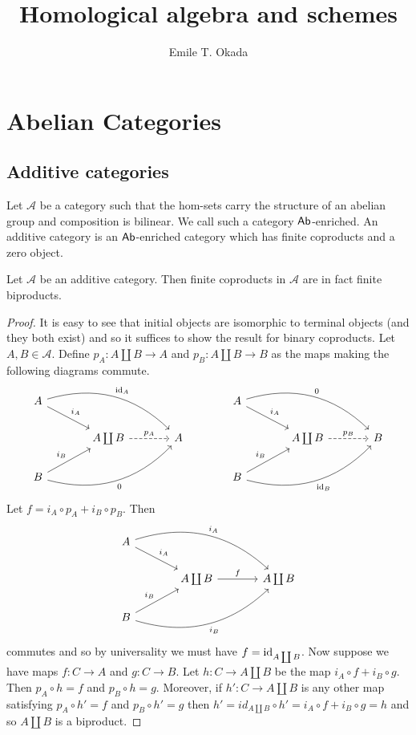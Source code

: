 \documentclass{memoir}
\title{Homological algebra and schemes}
\author{Emile T. Okada}
\begin{document}
\maketitle
\tableofcontents
\chapter{Abelian Categories}
\section{Additive categories}
Let $\mathcal A$ be a category such that the hom-sets carry the structure of an abelian group and composition is bilinear. We call such a category ${\normalfont\mathsf{Ab}}$-enriched.
An additive category is an ${\normalfont\mathsf{Ab}}$-enriched category which has finite coproducts and a zero object.
\begin{thm}
    \label{thm:atosa}
    Let $\mathcal A$ be an additive category.
    Then finite coproducts in $\mathcal A$ are in fact finite biproducts.
\end{thm}
\begin{proof}
    It is easy to see that initial objects are isomorphic to terminal objects (and they both exist) and so it suffices to show the result for binary coproducts.
    Let $A,B\in \mathcal A$.
    Define $p_A:A\coprod B\to A$ and $p_B:A\coprod B\to B$ as the maps making the following diagrams commute.
    \begin{equation}
        \begin{tikzcd}[column sep=large]
            A \arrow[dr,"i_A"] \arrow[drr,bend left=30,"\id_A"] & & & A \arrow[dr,"i_A"] \arrow[drr,bend left=30,"0"] & \\
                                     & A\coprod B \arrow[r,dashed,"p_A"] & A & & A\coprod B \arrow[r,dashed,"p_B"] & B \\
            B \arrow[ur,"i_B"] \arrow[urr,bend right=30,swap,"0"] & & & B \arrow[ur,"i_B"] \arrow[urr,bend right=30,swap,"\id_B"] &
        \end{tikzcd}
    \end{equation}
    Let $f=i_A\circ p_A + i_B\circ p_B$. Then
    \begin{equation}
        \begin{tikzcd}[column sep=large]
            A \arrow[dr,"i_A"] \arrow[drr,bend left=30,"i_A"] &  \\
                                     & A\coprod B \arrow[r,"f"] & A\coprod B  \\
            B \arrow[ur,"i_B"] \arrow[urr,bend right=30,swap,"i_B"] & 
        \end{tikzcd}
    \end{equation}
    commutes and so by universality we must have $f = \operatorname{id}_{A\coprod B}$.
    Now suppose we have maps $f:C\to A$ and $g:C\to B$. 
    Let $h:C\to A\coprod B$ be the map $i_A\circ f+i_B\circ g$.
    Then $p_A\circ h = f$ and $p_B\circ h = g$.
    Moreover, if $h':C\to A\coprod B$ is any other map satisfying $p_A\circ h' = f$ and $p_B\circ h' = g$ then $h' = id_{A\coprod B}\circ h' = i_A\circ f+i_B\circ g = h$ and so $A\coprod B$ is a biproduct.
\end{proof}
\end{document}
